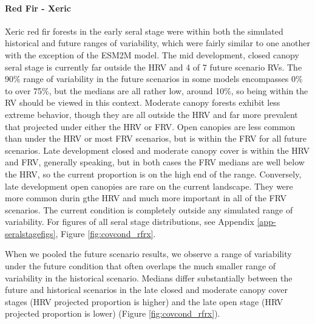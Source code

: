 \documentclass[12pt]{article}
\begin{document}
\begin{spacing}{1}
\paragraph{Red Fir - Xeric} Xeric red fir forests in the early seral stage were within both the simulated historical and future ranges of variability, which were fairly similar to one another with the exception of the ESM2M model. The mid development, closed canopy seral stage is currently far outside the HRV and 4 of 7 future scenario RVs. The 90\% range of variability in the future scenarios in some models encompasses 0\% to over 75\%, but the medians are all rather low, around 10\%, so being within the RV should be viewed in this context. Moderate canopy forests exhibit less extreme behavior, though they are all outside the HRV and far more prevalent that projected under either the HRV or FRV. Open canopies are less common than under the HRV or most FRV scenarios, but is within the FRV for all future scenarios. Late development closed and moderate canopy cover is within the HRV and FRV, generally speaking, but in both cases the FRV medians are well below the HRV, so the current proportion is on the high end of the range. Conversely, late development open canopies are rare on the current landscape. They were more common durin gthe HRV and much more important in all of the FRV scenarios. The current condition is completely outside any simulated range of variability. For figures of all seral stage distributions, see Appendix \ref{app-seralstagefigs}, Figure \ref{fig:covcond_rfrx}.

When we pooled the future scenario results, we observe a range of variability under the future condition that often overlaps the much smaller range of variability in the historical scenario. Medians differ substantially between the future and historical scenarios in the late closed and moderate canopy cover stages (HRV projected proportion is higher) and the late open stage (HRV projected proportion is lower) (Figure \ref{fig:covcond_rfrx}).


\end{spacing}
\end{document}
